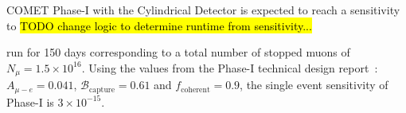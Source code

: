 COMET Phase-I with the Cylindrical Detector is expected to reach a sensitivity
to \hl{TODO change logic to determine runtime from sensitivity...}

run for 150 days corresponding to a total number of stopped muons of $N_\mu =
1.5 \times 10^{16}$. Using the values from the Phase-I technical design
report~\cite{the_comet_collaboration_comet_2020}: $A_{\mu-e} = 0.041$,
$\mathcal{B}_\mathrm{capture} = 0.61$ and $f_\mathrm{coherent} = 0.9$, the
single event sensitivity of Phase-I is $3 \times 10^{-15}$.






